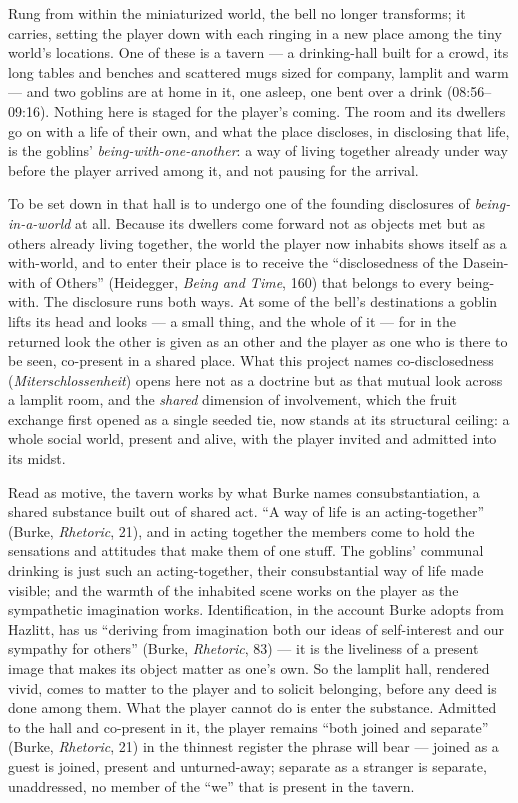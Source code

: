 \documentclass{article}
\begin{document}
Rung from within the miniaturized world, the bell no longer transforms; it carries, setting the player down with each ringing in a new place among the tiny world's locations. One of these is a tavern — a drinking-hall built for a crowd, its long tables and benches and scattered mugs sized for company, lamplit and warm — and two goblins are at home in it, one asleep, one bent over a drink (08:56--09:16). Nothing here is staged for the player's coming. The room and its dwellers go on with a life of their own, and what the place discloses, in disclosing that life, is the goblins' \textit{being-with-one-another}: a way of living together already under way before the player arrived among it, and not pausing for the arrival.

To be set down in that hall is to undergo one of the founding disclosures of \textit{being-in-a-world} at all. Because its dwellers come forward not as objects met but as others already living together, the world the player now inhabits shows itself as a with-world, and to enter their place is to receive the ``disclosedness of the Dasein-with of Others'' (Heidegger, \textit{Being and Time}, 160) that belongs to every being-with. The disclosure runs both ways. At some of the bell's destinations a goblin lifts its head and looks — a small thing, and the whole of it — for in the returned look the other is given as an other and the player as one who is there to be seen, co-present in a shared place. What this project names co-disclosedness (\textit{Miterschlossenheit}) opens here not as a doctrine but as that mutual look across a lamplit room, and the \textit{shared} dimension of involvement, which the fruit exchange first opened as a single seeded tie, now stands at its structural ceiling: a whole social world, present and alive, with the player invited and admitted into its midst.

Read as motive, the tavern works by what Burke names consubstantiation, a shared substance built out of shared act. ``A way of life is an acting-together'' (Burke, \textit{Rhetoric}, 21), and in acting together the members come to hold the sensations and attitudes that make them of one stuff. The goblins' communal drinking is just such an acting-together, their consubstantial way of life made visible; and the warmth of the inhabited scene works on the player as the sympathetic imagination works. Identification, in the account Burke adopts from Hazlitt, has us ``deriving from imagination both our ideas of self-interest and our sympathy for others'' (Burke, \textit{Rhetoric}, 83) — it is the liveliness of a present image that makes its object matter as one's own. So the lamplit hall, rendered vivid, comes to matter to the player and to solicit belonging, before any deed is done among them. What the player cannot do is enter the substance. Admitted to the hall and co-present in it, the player remains ``both joined and separate'' (Burke, \textit{Rhetoric}, 21) in the thinnest register the phrase will bear — joined as a guest is joined, present and unturned-away; separate as a stranger is separate, unaddressed, no member of the ``we'' that is present in the tavern.
\end{document}
